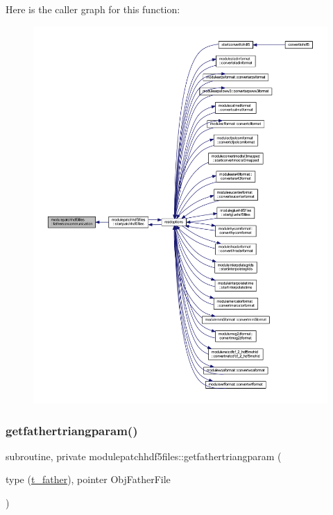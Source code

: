Here is the caller graph for this function\+:\nopagebreak
\begin{figure}[H]
\begin{center}
\leavevmode
\includegraphics[width=350pt]{namespacemodulepatchhdf5files_aa9e9da877fcc2414ea0022fe33fa09e9_icgraph}
\end{center}
\end{figure}
\mbox{\label{namespacemodulepatchhdf5files_ae089f4cffb7f9cab00153e6819836597}} 
\subsubsection{\texorpdfstring{getfathertriangparam()}{getfathertriangparam()}}
{\footnotesize\ttfamily subroutine, private modulepatchhdf5files\+::getfathertriangparam (\begin{DoxyParamCaption}\item[{type (\mbox{\hyperlink{structmodulepatchhdf5files_1_1t__father}{t\+\_\+father}}), pointer}]{Obj\+Father\+File }\end{DoxyParamCaption})\hspace{0.3cm}{\ttfamily [private]}}

